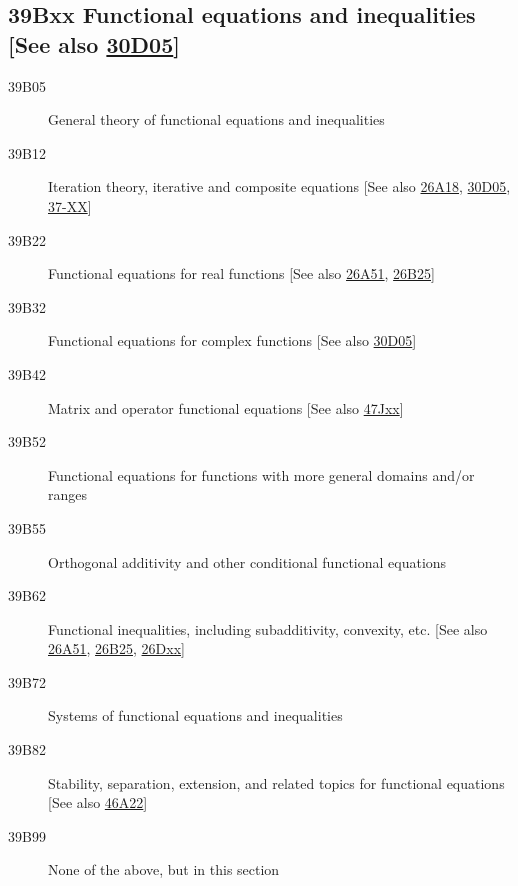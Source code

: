 \documentclass[letterpaper]{article}
\begin{document}
\subsection*{39Bxx  Functional equations and inequalities [See also \hyperref[30D05]{30D05}]}\label{39Bxx}
\begin{description}  
\item [39B05]\label{39B05} General theory of functional equations and inequalities
\item [39B12]\label{39B12} Iteration theory, iterative and composite equations [See also \hyperref[26A18]{26A18}, \hyperref[30D05]{30D05}, \hyperref[37-XX]{37-XX}]
\item [39B22]\label{39B22} Functional equations for real functions [See also \hyperref[26A51]{26A51}, \hyperref[26B25]{26B25}]
\item [39B32]\label{39B32} Functional equations for complex functions [See also \hyperref[30D05]{30D05}]
\item [39B42]\label{39B42} Matrix and operator functional equations [See also \hyperref[47Jxx]{47Jxx}]
\item [39B52]\label{39B52} Functional equations for functions with more general domains and/or ranges
\item [39B55]\label{39B55} Orthogonal additivity and other conditional functional equations
\item [39B62]\label{39B62} Functional inequalities, including subadditivity, convexity, etc. [See also \hyperref[26A51]{26A51}, \hyperref[26B25]{26B25}, \hyperref[26Dxx]{26Dxx}]
\item [39B72]\label{39B72} Systems of functional equations and inequalities
\item [39B82]\label{39B82} Stability, separation, extension, and related topics for functional equations [See also \hyperref[46A22]{46A22}]
\item [39B99]\label{39B99} None of the above, but in this section
\end{description}
\end{document}
